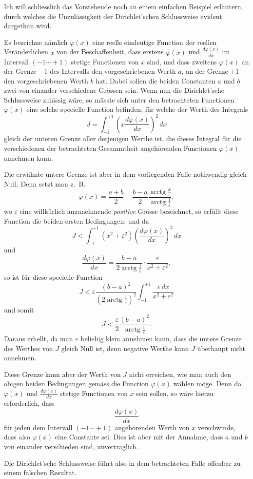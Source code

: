 \documentclass{article}
\begin{document}
Ich will schliesslich das Vorstehende noch an einem einfachen Beispiel erläutern, durch welches die Unzulässigkeit der Dirichlet’schen Schlussweise evident dargethan wird.

Es bezeichne nämlich $\varphi(x)$ eine reelle eindeutige Function der reellen Veränderlichen $x$ von der Beschaffenheit, dass erstens $\varphi(x)$ und $\frac{d\varphi(x)}{dx}$ im Intervall $(-1 \cdots +1)$ stetige Functionen von $x$ sind, und dass zweitens $\varphi(x)$ an der Grenze $-1$ des Intervalls den vorgeschriebenen Werth $a$, an der
Grenze $+1$ den vorgeschriebenen Werth $b$ hat. Dabei sollen die beiden Constanten $a$ und $b$ zwei von einander verschiedene Grössen sein. Wenn nun die Dirichlet’sche Schlussweise zulässig wäre, so müsste sich unter den betrachteten Functionen $\varphi(x)$ eine solche specielle Function befinden, für welche der Werth des Integrals
\[
J = \int_{-1}^{+1} \left( x \frac{d\varphi(x)}{dx} \right)^{2} \,dx
\]
gleich der unteren Grenze aller derjenigen Werthe ist, die dieses Integral für die verschiedenen der betrachteten Gesammtheit angehörenden Functionen $\varphi(x)$ annehmen kann.

Die erwähnte untere Grenze ist aber in dem vorliegenden Falle nothwendig gleich Null. Denn setzt man z.\ B.
\[
\varphi(x) = \frac{a+b}{2} + \frac{b-a}{2} \frac{\operatorname{arctg} \frac{x}{\varepsilon}}{\operatorname{arctg} \frac{1}{\varepsilon}},
\]
wo $\varepsilon$ eine willkürlich anzunehmende \emph{positive} Grösse bezeichnet, so erfüllt diese Function die beiden ersten Bedingungen; und da
\[
J < \int_{-1}^{+1} (x^{2} + \varepsilon^{2}) \left( \frac{d\varphi(x)}{dx} \right)^{2} \,dx
\]
und
\[
\frac{d\varphi(x)}{dx} = \frac{b-a}{2 \operatorname{arctg} \frac{1}{\varepsilon}} \cdot \frac{\varepsilon}{x^{2} + \varepsilon^{2}},
\]
so ist für diese specielle Function
\[
J < \varepsilon \frac{(b-a)^{2}}{\left( 2 \operatorname{arctg} \frac{1}{\varepsilon} \right)^{2}} \int_{-1}^{+1} \frac{\varepsilon \,dx}{x^{2} + \varepsilon^{2}}
\]
und somit
\[
J < \frac{\varepsilon}{2} \frac{(b-a)^{2}}{\operatorname{arctg} \frac{1}{\varepsilon}}.
\]
Daraus erhellt, da man $\varepsilon$ beliebig klein annehmen kann, dass die untere Grenze des Werthes von $J$ gleich Null ist, denn negative Werthe kann $J$ überhaupt nicht annehmen.

Diese Grenze kann aber der Werth von $J$ nicht erreichen, wie man auch den obigen beiden Bedingungen gemäss die Function $\varphi(x)$ wählen möge. Denn da $\varphi(x)$ und $\frac{d\varphi(x)}{dx}$ stetige Functionen von $x$ sein sollen, so wäre hierzu erforderlich, dass
\[
\frac{d\varphi(x)}{dx}
\]
für jeden dem Intervall $(-1 \cdots +1)$ angehörenden Werth von $x$ verschwinde, dass also $\varphi(x)$ eine Constante sei. Dies ist aber mit der Annahme, dass $a$ und $b$ von einander verschieden sind, unverträglich.

Die Dirichlet’sche Schlussweise führt also in dem betrachteten Falle offenbar zu einem falschen Resultat.
\end{document}
